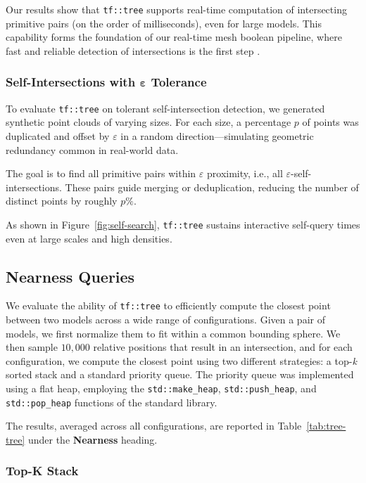 Our results show that \texttt{tf::tree} supports real-time
computation of intersecting primitive pairs (on the order of
milliseconds), even for large models. This capability forms the
foundation of our real-time mesh boolean pipeline, where fast and
reliable detection of intersections is the first step
\cite{sajovic2025trueform}.

\subsubsection{Self-Intersections with $\mathbf{\varepsilon}$ Tolerance}

To evaluate \texttt{tf::tree} on tolerant self-intersection detection,
we generated synthetic point clouds of varying sizes. For each size,
a percentage $p$ of points was duplicated and offset by $\varepsilon$
in a random direction—simulating geometric redundancy common in
real-world data.

The goal is to find all primitive pairs within $\varepsilon$ proximity,
i.e., all $\varepsilon$-self-intersections. These pairs guide merging
or deduplication, reducing the number of distinct points by roughly $p\%$.

As shown in Figure~\ref{fig:self-search}, \texttt{tf::tree} sustains
interactive self-query times even at large scales and high densities.

\subsection{Nearness Queries}

We evaluate the ability of \texttt{tf::tree} to efficiently compute
the closest point between two models across a wide range of
configurations. Given a pair of models, we first normalize them to
fit within a common bounding sphere. We then sample $10{,}000$
relative positions that result in an intersection, and for each
configuration, we compute the closest point using two different
strategies: a top-\emph{k} sorted stack and a standard priority queue.
The priority queue was implemented using a flat heap, employing the
\texttt{std::make\_heap}, \texttt{std::push\_heap}, and
\texttt{std::pop\_heap} functions of the standard \cpp library.

The results, averaged across all configurations, are reported in
Table~\ref{tab:tree-tree} under the \textbf{Nearness} heading.

\subsubsection{Top-K Stack}\label{sec:topk}

